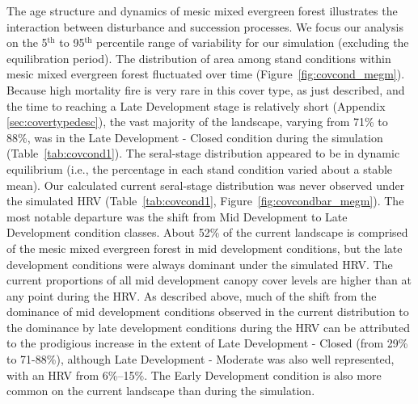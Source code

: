 The age structure and dynamics of mesic mixed evergreen forest illustrates the interaction between disturbance and succession processes. We focus our analysis on the 5$^{\text{th}}$ to 95$^{\text{th}}$ percentile range of variability for our simulation (excluding the equilibration period). %
%
The distribution of area among stand conditions within mesic mixed evergreen forest fluctuated over time (Figure~\ref{fig:covcond_megm}). Because high mortality fire is very rare in this cover type, as just described, and the time to reaching a Late Development stage is relatively short (Appendix \ref{sec:covertypedesc}), the vast majority of the landscape, varying from 71\% to 88\%, was in the Late Development - Closed condition during the simulation (Table~\ref{tab:covcond1}). %
%
The seral-stage distribution appeared to be in dynamic equilibrium (i.e., the percentage in each stand condition varied about a stable mean). Our calculated current seral-stage distribution was never observed under the simulated HRV (Table~\ref{tab:covcond1}, Figure~\ref{fig:covcondbar_megm}). The most notable departure was the shift from Mid Development to Late Development condition classes. About 52\% of the current landscape is comprised of the mesic mixed evergreen forest in mid development conditions, but the late development conditions were always dominant under the simulated HRV. The current proportions of all mid development canopy cover levels are higher than at any point during the HRV. As described above, much of the shift from the dominance of mid development conditions observed in the current distribution to the dominance by late development conditions during the HRV can be attributed to the prodigious increase in the extent of Late Development - Closed (from 29\% to 71-88\%), although Late Development - Moderate was also well represented, with an HRV from 6\%--15\%. The Early Development condition is also more common on the current landscape than during the simulation.


